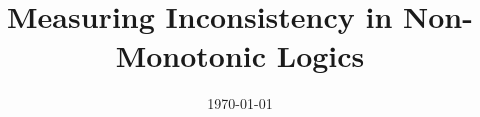\documentclass[aspectratio=169]{beamer} %
\title{Measuring Inconsistency in Non-Monotonic Logics}
\author[\myAuthorAbbr]{\myAuthor}
\institute{Artificial Intelligence Group,\\
University of Hagen, Germany}
\date{\today}
\begin{document}

\begin{frame}
    \titlepage
\end{frame}
\nologo




% 
\end{document}
